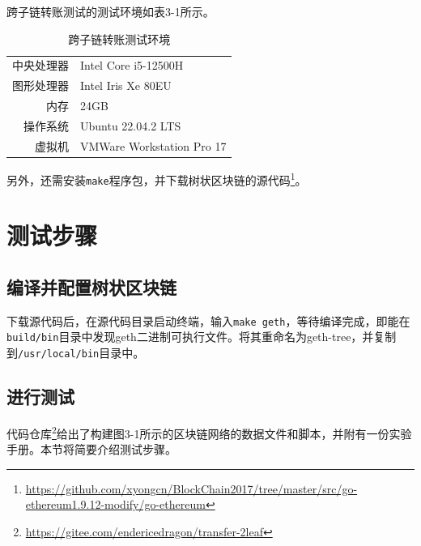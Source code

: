 跨子链转账测试的测试环境如表3-1所示。

\begin{table}[htbp]
    \linespread{1.5}
    \centering
    \caption{跨子链转账测试环境}\label{跨子链转账测试环境}
    \begin{tabular}{r|l} \toprule
        中央处理器 & Intel Core i5-12500H      \\
        图形处理器 & Intel Iris Xe 80EU        \\
        内存    & 24GB                      \\
        操作系统  & Ubuntu 22.04.2 LTS        \\
        虚拟机   & VMWare Workstation Pro 17 \\
        \bottomrule
    \end{tabular}
\end{table}

另外，还需安装\verb|make|程序包，并下载树状区块链的源代码\footnote{\url{https://github.com/xyongcn/BlockChain2017/tree/master/src/go-ethereum1.9.12-modify/go-ethereum}}。

\section{测试步骤}

\subsection{编译并配置树状区块链}

下载源代码后，在源代码目录启动终端，输入\verb|make geth|，等待编译完成，即能在\verb|build/bin|目录中发现geth二进制可执行文件。将其重命名为geth-tree，并复制到\verb|/usr/local/bin|目录中。

\subsection{进行测试}

代码仓库\footnote{\url{https://gitee.com/endericedragon/transfer-2leaf}}给出了构建图3-1所示的区块链网络的数据文件和脚本，并附有一份实验手册。本节将简要介绍测试步骤。


